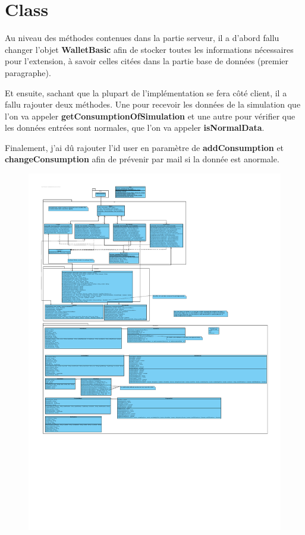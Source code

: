 \section{Class}

\begin{flushleft}
Au niveau des méthodes contenues dans la partie serveur, il a d'abord fallu changer l'objet \textbf{WalletBasic} afin de stocker toutes les informations nécessaires pour l'extension, à savoir celles citées dans la partie base de données (premier paragraphe).
\end{flushleft}

\begin{flushleft}
Et ensuite, sachant que la plupart de l'implémentation se fera côté client, il a fallu rajouter deux méthodes. Une pour recevoir les données de la simulation que l'on va appeler \textbf{getConsumptionOfSimulation} et une autre pour vérifier que les données entrées sont normales, que l'on va appeler \textbf{isNormalData}.
\end{flushleft}

\begin{flushleft}
Finalement, j'ai dû rajouter l'id user en paramètre de \textbf{addConsumption} et \textbf{changeConsumption} afin de prévenir par mail si la donnée est anormale.
\end{flushleft}

\begin{figure}[h]
\centering
\includegraphics[width=1.3\textwidth]{extension-adrien/ClassDiagram/img/classDiagram.pdf}
\end{figure}
